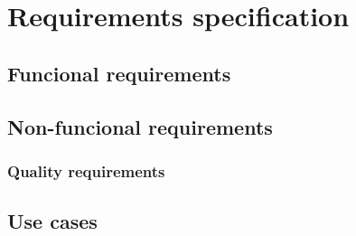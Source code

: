 
\chapter{Requirements specification} %

\label{Requirements} %


\section{Funcional requirements}

\section{Non-funcional requirements}

\subsection{Quality requirements}
\subsection{}


\section{Use cases}

